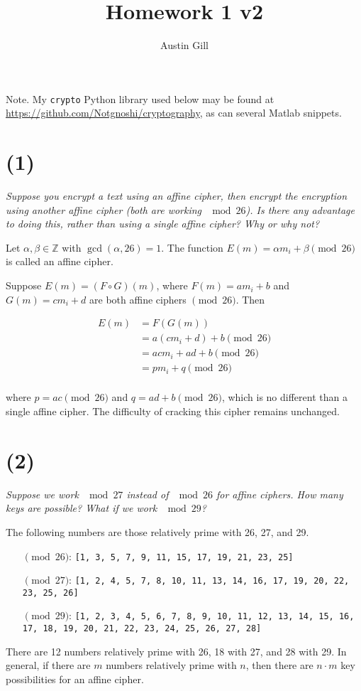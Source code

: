 \documentclass[12pt]{article}
\title{Homework 1 v2}
\author{Austin Gill}
\begin{document}
    \maketitle

    Note. My \texttt{crypto} Python library used below may be found at \url{https://github.com/Notgnoshi/cryptography}, as can several Matlab snippets.
\section*{(1)} \textit{Suppose you encrypt a text using an affine cipher, then encrypt the encryption using another affine cipher (both are working $\mod{26}$). Is there any advantage to doing this, rather than using a single affine cipher? Why or why not?}

    \begin{defn}
    Let $\alpha , \beta \in \mathbb Z$ with $\gcd(\alpha , 26) = 1$. The function $E(m) = \alpha m_i + \beta \pmod{26}$ is called an affine cipher.
    \end{defn}

    Suppose $E(m) = (F \circ G)(m)$, where $F(m) = am_i + b$ and $G(m) = cm_i + d$ are both affine ciphers $\pmod{26}$. Then

    \begin{align*}
        E(m) &= F(G(m))\\
             &= a(cm_i + d) + b \pmod{26}\\
             &= acm_i + ad + b \pmod{26}\\
             &= pm_i + q \pmod{26}\\
    \end{align*}

    where $p = ac \pmod{26}$ and $q = ad + b \pmod{26}$, which is no different than a single affine cipher. The difficulty of cracking this cipher remains unchanged.

\section*{(2)} \textit{Suppose we work $\mod{27}$ instead of $\mod{26}$ for affine ciphers. How many keys are possible? What if we work $\mod{29}$?}

    The following numbers are those relatively prime with 26, 27, and 29.
    \begin{itemize}
      \item[$\pmod{26}$:]
      \texttt{[1, 3, 5, 7, 9, 11, 15, 17, 19, 21, 23, 25]}
      \item[$\pmod{27}$:]
      \texttt{[1, 2, 4, 5, 7, 8, 10, 11, 13, 14, 16, 17, 19, 20, 22, 23, 25, 26]}
      \item[$\pmod{29}$:]
      \texttt{[1, 2, 3, 4, 5, 6, 7, 8, 9, 10, 11, 12, 13, 14, 15, 16, 17, 18, 19, 20, 21, 22, 23, 24, 25, 26, 27, 28]}
    \end{itemize}
    There are 12 numbers relatively prime with 26, 18 with 27, and 28 with 29. In general, if there are $m$ numbers relatively prime with $n$, then there are $n\cdot m$ key possibilities for an affine cipher.
\end{document}
